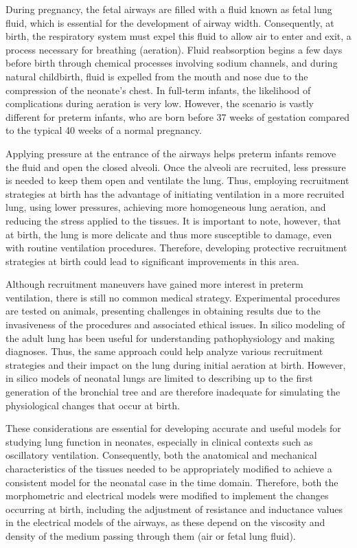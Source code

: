 
During pregnancy, the fetal airways are filled with a fluid known as
fetal lung fluid, which is essential for the development of airway
width. Consequently, at birth, the respiratory system must expel this
fluid to allow air to enter and exit, a process necessary for
breathing (aeration). Fluid reabsorption begins a few days before
birth through chemical processes involving sodium channels, and during
natural childbirth, fluid is expelled from the mouth and nose due to
the compression of the neonate's chest. In full-term infants, the
likelihood of complications during aeration is very low. However, the
scenario is vastly different for preterm infants, who are born before
37 weeks of gestation compared to the typical 40 weeks of a normal
pregnancy.

Applying pressure at the entrance of the airways helps preterm infants
remove the fluid and open the closed alveoli. Once the alveoli are
recruited, less pressure is needed to keep them open and ventilate the
lung. Thus, employing recruitment strategies at birth has the
advantage of initiating ventilation in a more recruited lung, using
lower pressures, achieving more homogeneous lung aeration, and
reducing the stress applied to the tissues. It is important to note,
however, that at birth, the lung is more delicate and thus more
susceptible to damage, even with routine ventilation
procedures. Therefore, developing protective recruitment strategies at
birth could lead to significant improvements in this area.

Although recruitment maneuvers have gained more interest in preterm
ventilation, there is still no common medical strategy. Experimental
procedures are tested on animals, presenting challenges in obtaining
results due to the invasiveness of the procedures and associated
ethical issues\cite{al-jumaily2011,herrmann2016}. In silico modeling
of the adult lung has been useful for understanding pathophysiology
and making diagnoses. Thus, the same approach could help analyze
various recruitment strategies and their impact on the lung during
initial aeration at birth. However, in silico models of neonatal lungs
are limited to describing up to the first generation of the bronchial
tree and are therefore inadequate for simulating the physiological
changes that occur at birth.

These considerations are essential for developing accurate and useful
models for studying lung function in neonates, especially in clinical
contexts such as oscillatory ventilation. Consequently, both the
anatomical and mechanical characteristics of the tissues needed to be
appropriately modified to achieve a consistent model for the neonatal
case in the time domain. Therefore, both the morphometric and
electrical models were modified to implement the changes occurring at
birth, including the adjustment of resistance and inductance values in
the electrical models of the airways, as these depend on the viscosity
and density of the medium passing through them (air or fetal lung
fluid).

